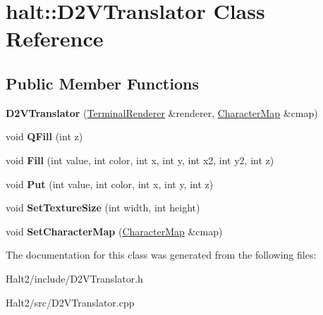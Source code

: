 \hypertarget{classhalt_1_1_d2_v_translator}{\section{halt\-:\-:\-D2\-V\-Translator \-Class \-Reference}
\label{classhalt_1_1_d2_v_translator}
}
\subsection*{\-Public \-Member \-Functions}
\begin{DoxyCompactItemize}
\item 
\hypertarget{classhalt_1_1_d2_v_translator_aaa8bb336d7e31ee16c8ca8ba806e99d9}{{\bfseries \-D2\-V\-Translator} (\hyperlink{classhalt_1_1_terminal_renderer}{\-Terminal\-Renderer} \&renderer, \hyperlink{classhalt_1_1_character_map}{\-Character\-Map} \&cmap)}\label{classhalt_1_1_d2_v_translator_aaa8bb336d7e31ee16c8ca8ba806e99d9}

\item 
\hypertarget{classhalt_1_1_d2_v_translator_a7540a376fd23b0527c88c0599982075b}{void {\bfseries \-Q\-Fill} (int z)}\label{classhalt_1_1_d2_v_translator_a7540a376fd23b0527c88c0599982075b}

\item 
\hypertarget{classhalt_1_1_d2_v_translator_a5bce34e09f7b2663e698a3c51c4de54f}{void {\bfseries \-Fill} (int value, int color, int x, int y, int x2, int y2, int z)}\label{classhalt_1_1_d2_v_translator_a5bce34e09f7b2663e698a3c51c4de54f}

\item 
\hypertarget{classhalt_1_1_d2_v_translator_acd07f2854bfc900587ee023ae2d01f4c}{void {\bfseries \-Put} (int value, int color, int x, int y, int z)}\label{classhalt_1_1_d2_v_translator_acd07f2854bfc900587ee023ae2d01f4c}

\item 
\hypertarget{classhalt_1_1_d2_v_translator_ae57f315375185f1890a8a02ef2000bfa}{void {\bfseries \-Set\-Texture\-Size} (int width, int height)}\label{classhalt_1_1_d2_v_translator_ae57f315375185f1890a8a02ef2000bfa}

\item 
\hypertarget{classhalt_1_1_d2_v_translator_aa6b3a08f5a683c5f026ab2cd850fcfe8}{void {\bfseries \-Set\-Character\-Map} (\hyperlink{classhalt_1_1_character_map}{\-Character\-Map} \&cmap)}\label{classhalt_1_1_d2_v_translator_aa6b3a08f5a683c5f026ab2cd850fcfe8}

\end{DoxyCompactItemize}


\-The documentation for this class was generated from the following files\-:\begin{DoxyCompactItemize}
\item 
\-Halt2/include/\-D2\-V\-Translator.\-h\item 
\-Halt2/src/\-D2\-V\-Translator.\-cpp\end{DoxyCompactItemize}
